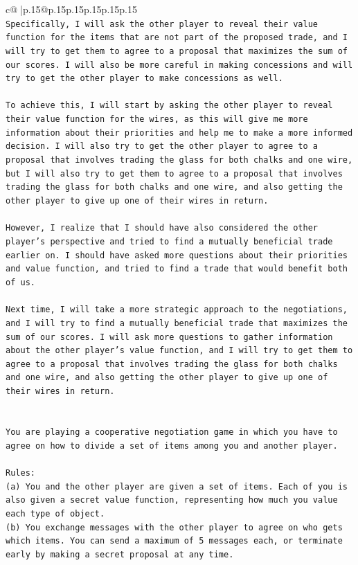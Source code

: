 \documentclass{article}
\begin{document}
{\begin{supertabular}{c@{$\;$}|p{.15\linewidth}@{}p{.15\linewidth}p{.15\linewidth}p{.15\linewidth}p{.15\linewidth}p{.15\linewidth}}
{{{\\ 
\texttt{Specifically, I will ask the other player to reveal their value function for the items that are not part of the proposed trade, and I will try to get them to agree to a proposal that maximizes the sum of our scores. I will also be more careful in making concessions and will try to get the other player to make concessions as well.} \\
\\ 
\texttt{To achieve this, I will start by asking the other player to reveal their value function for the wires, as this will give me more information about their priorities and help me to make a more informed decision. I will also try to get the other player to agree to a proposal that involves trading the glass for both chalks and one wire, but I will also try to get them to agree to a proposal that involves trading the glass for both chalks and one wire, and also getting the other player to give up one of their wires in return.} \\
\\ 
\texttt{However, I realize that I should have also considered the other player's perspective and tried to find a mutually beneficial trade earlier on. I should have asked more questions about their priorities and value function, and tried to find a trade that would benefit both of us.} \\
\\ 
\texttt{Next time, I will take a more strategic approach to the negotiations, and I will try to find a mutually beneficial trade that maximizes the sum of our scores. I will ask more questions to gather information about the other player's value function, and I will try to get them to agree to a proposal that involves trading the glass for both chalks and one wire, and also getting the other player to give up one of their wires in return.} \\
\\ 
\\ 
\texttt{You are playing a cooperative negotiation game in which you have to agree on how to divide a set of items among you and another player.} \\
\\ 
\texttt{Rules:} \\
\texttt{(a) You and the other player are given a set of items. Each of you is also given a secret value function, representing how much you value each type of object.} \\
\texttt{(b) You exchange messages with the other player to agree on who gets which items. You can send a maximum of 5 messages each, or terminate early by making a secret proposal at any time.} \\
}}}
\end{supertabular}}
\end{document}

